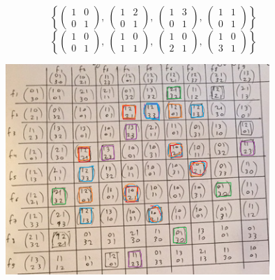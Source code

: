 \documentclass[11pt, fleqn]{article}
\begin{document}
\begin{enumerate}
      \[\left\{ \begin{pmatrix}
          1 & 0\\
          0 & 1
      \end{pmatrix},\ \begin{pmatrix}
          1 & 2\\
          0 & 1
      \end{pmatrix},\ \begin{pmatrix}
          1 & 3\\
          0 & 1
      \end{pmatrix},\ \begin{pmatrix}
          1 & 1\\
          0 & 1
      \end{pmatrix}\right\}\]
      \[\left\{ \begin{pmatrix}
          1 & 0\\
          0 & 1
      \end{pmatrix},\ \begin{pmatrix}
          1 & 0\\
          1 & 1
      \end{pmatrix},\ \begin{pmatrix}
          1 & 0\\
          2 & 1
      \end{pmatrix},\ \begin{pmatrix}
          1 & 0\\
          3 & 1
      \end{pmatrix}\right\}\]
      \begin{figure}[H]
          \centering
          \includegraphics[width=10cm]{3_2.png}
      \end{figure}


\end{enumerate}
\end{document}
